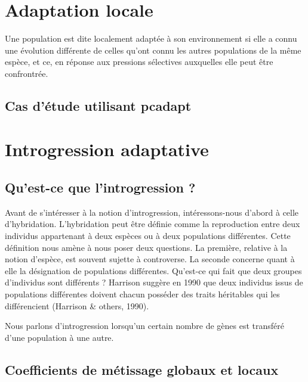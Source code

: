\documentclass[12pt,twoside]{reedthesis}
\begin{document}
  \chapter{Adaptation locale}\label{adaptation-locale}
  
  Une population est dite localement adaptée à son environnement si elle a
  connu une évolution différente de celles qu'ont connu les autres
  populations de la même espèce, et ce, en réponse aux pressions
  sélectives auxquelles elle peut être confrontrée.
  
  \section{Cas d'étude utilisant
  pcadapt}\label{cas-detude-utilisant-pcadapt}
  
  \chapter{Introgression adaptative}\label{introgression-adaptative}
  
  \section{Qu'est-ce que l'introgression
  ?}\label{quest-ce-que-lintrogression}
  
  Avant de s'intéresser à la notion d'introgression, intéressons-nous
  d'abord à celle d'hybridation. L'hybridation peut être définie comme la
  reproduction entre deux individus appartenant à deux espèces ou à deux
  populations différentes. Cette définition nous amène à nous poser deux
  questions. La première, relative à la notion d'espèce, est souvent
  sujette à controverse. La seconde concerne quant à elle la désignation
  de populations différentes. Qu'est-ce qui fait que deux groupes
  d'individus sont différents ? Harrison suggère en 1990 que deux
  individus issus de populations différentes doivent chacun posséder des
  traits héritables qui les différencient (Harrison \& others, 1990).
  
  Nous parlons d'introgression lorsqu'un certain nombre de gènes est
  transféré d'une population à une autre.
  
  \section{Coefficients de métissage globaux et
  locaux}\label{coefficients-de-metissage-globaux-et-locaux}
  
\end{document}
